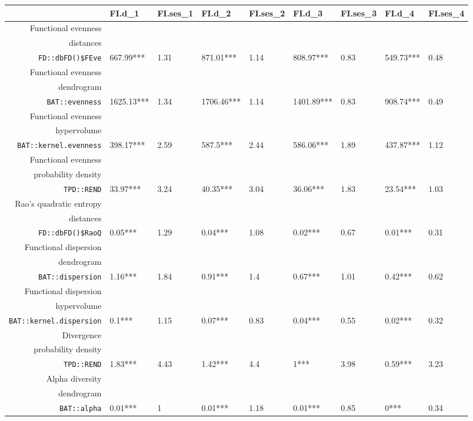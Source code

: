 \begin{table}[ht]
\scriptsize
\centering
\begin{tabular}{rllllllll}
  \hline
 & FI.d\_1 & FI.ses\_1 & FI.d\_2 & FI.ses\_2 & FI.d\_3 & FI.ses\_3 & FI.d\_4 & FI.ses\_4 \\ 
  \hline
Functional evenness\\distances\\\texttt{FD::dbFD()\$FEve} & 667.99*** & 1.31 & 871.01*** & 1.14 & 808.97*** & 0.83 & 549.73*** & 0.48 \\ 
  Functional evenness\\dendrogram\\\texttt{BAT::evenness} & 1625.13*** & 1.34 & 1706.46*** & 1.14 & 1401.89*** & 0.83 & 908.74*** & 0.49 \\ 
  Functional evenness\\hypervolume\\\texttt{BAT::kernel.evenness} & 398.17*** & 2.59 & 587.5*** & 2.44 & 586.06*** & 1.89 & 437.87*** & 1.12 \\ 
  Functional evenness\\probability density\\\texttt{TPD::REND} & 33.97*** & 3.24 & 40.35*** & 3.04 & 36.06*** & 1.83 & 23.54*** & 1.03 \\ 
  Rao's quadratic entropy\\distances\\\texttt{FD::dbFD()\$RaoQ} & 0.05*** & 1.29 & 0.04*** & 1.08 & 0.02*** & 0.67 & 0.01*** & 0.31 \\ 
  Functional dispersion\\dendrogram\\\texttt{BAT::dispersion} & 1.16*** & 1.84 & 0.91*** & 1.4 & 0.67*** & 1.01 & 0.42*** & 0.62 \\ 
  Functional dispersion\\hypervolume\\\texttt{BAT::kernel.dispersion} & 0.1*** & 1.15 & 0.07*** & 0.83 & 0.04*** & 0.55 & 0.02*** & 0.32 \\ 
  Divergence\\probability density\\\texttt{TPD::REND} & 1.83*** & 4.43 & 1.42*** & 4.4 & 1*** & 3.98 & 0.59*** & 3.23 \\ 
  Alpha diversity\\dendrogram\\\texttt{BAT::alpha} & 0.01*** & 1 & 0.01*** & 1.18 & 0.01*** & 0.85 & 0*** & 0.34 \\ 

\end{tabular}
\end{table}

